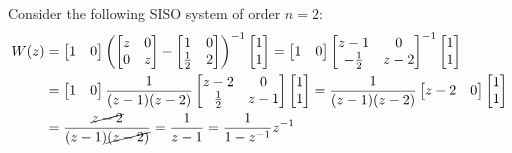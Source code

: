 \begin{exa}{Consider the following SISO system of order $n=2$:}
\begin{align*}
W(z) &=
\begin{bmatrix}
    1 & 0\\
\end{bmatrix}
\left( \begin{bmatrix}
    z & 0\\
    0 & z\\
\end{bmatrix}
-
\begin{bmatrix}
    1 & 0 \\
    \frac{1}{2} & 2\\
\end{bmatrix}\right)^{-1}
\begin{bmatrix}
    1\\
    1\\
\end{bmatrix}
= \begin{bmatrix}
    1 & 0\\
\end{bmatrix}
\begin{bmatrix}
    z-1 & 0\\
    -\frac{1}{2} & z-2\\
\end{bmatrix}^{-1}
\begin{bmatrix}
    1\\
    1\\
\end{bmatrix}\\
&= \begin{bmatrix}
    1 & 0\\
\end{bmatrix}
\frac{1}{(z-1)(z-2)}
\begin{bmatrix}
    z-2 & 0\\
    \frac{1}{2} & z-1\\
\end{bmatrix}
\begin{bmatrix}
    1\\
    1\\
\end{bmatrix}
=
\frac{1}{(z-1)(z-2)}
\begin{bmatrix}
    z-2 & 0\\
\end{bmatrix}
\begin{bmatrix}
    1\\
    1\\
\end{bmatrix}\\
&=
\frac{\cancel{z-2}}{(z-1)\cancel{(z-2)}} = \frac{1}{z-1} = \frac{1}{1-z^{-1}} z^{-1}

\end{align*}
\end{exa}
